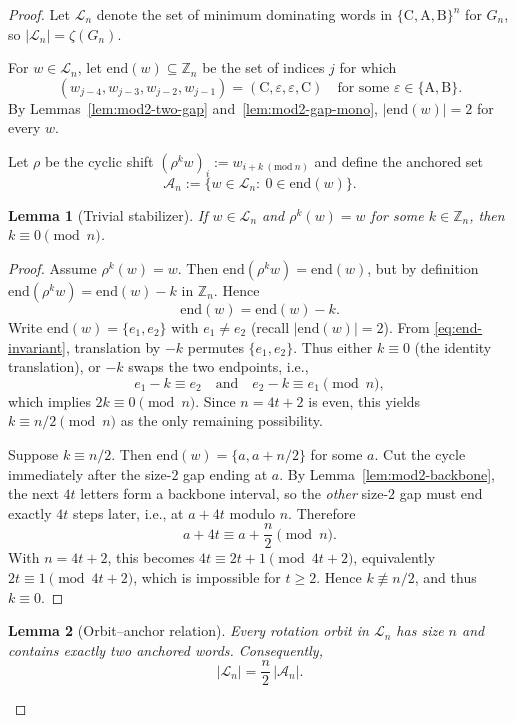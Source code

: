 \documentclass[10pt,a4paper]{amsart}
\newtheorem{lemma}{Lemma}
\newcommand{\ZZ}{\mathbb{Z}}
\newcommand{\colA}{\mathrm{A}}
\newcommand{\colB}{\mathrm{B}}
\newcommand{\colC}{\mathrm{C}}
\begin{document}
\begin{proof}
Let $\mathcal{L}_n$ denote the set of minimum dominating words in
$\{\colC,\colA,\colB\}^n$ for $G_n$, so $|\mathcal{L}_n|=\zeta(G_n)$.

For $w\in\mathcal{L}_n$, let $\mathrm{end}(w)\subseteq\ZZ_n$ be the set of indices $j$
for which
\[
(w_{j-4},w_{j-3},w_{j-2},w_{j-1})
=(\colC,\varepsilon,\varepsilon,\colC)
\quad\text{for some }\varepsilon\in\{\colA,\colB\}.
\]
By Lemmas~\ref{lem:mod2-two-gap} and~\ref{lem:mod2-gap-mono},
$|\mathrm{end}(w)|=2$ for every $w$.

Let $\rho$ be the cyclic shift $(\rho^k w)_i:=w_{i+k\ (\mathrm{mod}\ n)}$ and define the
anchored set
\[
\mathcal{A}_n:=\{w\in\mathcal{L}_n:\ 0\in\mathrm{end}(w)\}.
\]

\begin{lemma}[Trivial stabilizer]\label{lem:trivial-stab}
If $w\in\mathcal{L}_n$ and $\rho^k(w)=w$ for some $k\in\ZZ_n$, then $k\equiv 0\pmod n$.
\end{lemma}

\begin{proof}
Assume $\rho^k(w)=w$. Then $\mathrm{end}(\rho^k w)=\mathrm{end}(w)$, but by definition
$\mathrm{end}(\rho^k w)=\mathrm{end}(w)-k$ in $\ZZ_n$. Hence
\begin{equation}\label{eq:end-invariant}
\mathrm{end}(w)=\mathrm{end}(w)-k.
\end{equation}
Write $\mathrm{end}(w)=\{e_1,e_2\}$ with $e_1\neq e_2$ (recall $|\mathrm{end}(w)|=2$).
From \eqref{eq:end-invariant}, translation by $-k$ permutes $\{e_1,e_2\}$.
Thus either $k\equiv 0$ (the identity translation), or $-k$ swaps the two endpoints, i.e.,
\[
e_1-k\equiv e_2\quad\text{and}\quad e_2-k\equiv e_1 \pmod n,
\]
which implies $2k\equiv 0\pmod n$. Since $n=4t+2$ is even, this yields $k\equiv n/2\pmod n$
as the only remaining possibility.

Suppose $k\equiv n/2$. Then $\mathrm{end}(w)=\{a,a+n/2\}$ for some $a$.
Cut the cycle immediately after the size-$2$ gap ending at $a$.
By Lemma~\ref{lem:mod2-backbone}, the next $4t$ letters form a backbone interval, so the
\emph{other} size-$2$ gap must end exactly $4t$ steps later, i.e., at $a+4t$ modulo $n$.
Therefore
\[
a+4t \equiv a+\frac{n}{2}\pmod n.
\]
With $n=4t+2$, this becomes $4t\equiv 2t+1\pmod{4t+2}$, equivalently $2t\equiv 1\pmod{4t+2}$,
which is impossible for $t\ge 2$. Hence $k\not\equiv n/2$, and thus $k\equiv 0$.
\end{proof}

\begin{lemma}[Orbit--anchor relation]\label{lem:orbit-anchor}
Every rotation orbit in $\mathcal{L}_n$ has size $n$ and contains exactly two anchored
words.  Consequently,
\begin{equation}\label{eq:orbit-formula}
|\mathcal{L}_n|=\frac{n}{2}\,|\mathcal{A}_n|.
\end{equation}
\end{lemma}


\end{proof}
\end{document}
